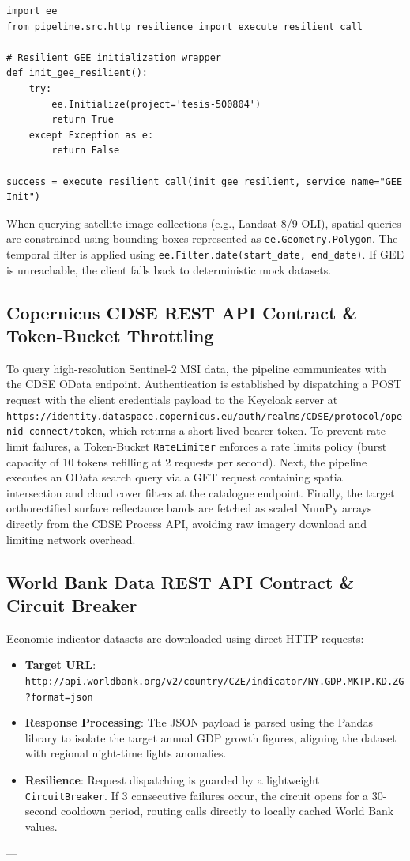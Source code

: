 \begin{verbatim}
import ee
from pipeline.src.http_resilience import execute_resilient_call

# Resilient GEE initialization wrapper
def init_gee_resilient():
    try:
        ee.Initialize(project='tesis-500804')
        return True
    except Exception as e:
        return False

success = execute_resilient_call(init_gee_resilient, service_name="GEE Init")
\end{verbatim}
When querying satellite image collections (e.g., Landsat-8/9 OLI), spatial queries are constrained using bounding boxes represented as \texttt{ee.Geometry.Polygon}. The temporal filter is applied using \texttt{ee.Filter.date(start\_date, end\_date)}. If GEE is unreachable, the client falls back to deterministic mock datasets.

\subsection{Copernicus CDSE REST API Contract \& Token-Bucket Throttling}
To query high-resolution Sentinel-2 MSI data, the pipeline communicates with the CDSE OData endpoint. Authentication is established by dispatching a POST request with the client credentials payload to the Keycloak server at \texttt{https://identity.dataspace.copernicus.eu/auth/realms/CDSE/protocol/openid-connect/token}, which returns a short-lived bearer token. To prevent rate-limit failures, a Token-Bucket \texttt{RateLimiter} enforces a rate limits policy (burst capacity of 10 tokens refilling at 2 requests per second). Next, the pipeline executes an OData search query via a GET request containing spatial intersection and cloud cover filters at the catalogue endpoint. Finally, the target orthorectified surface reflectance bands are fetched as scaled NumPy arrays directly from the CDSE Process API, avoiding raw imagery download and limiting network overhead.

\subsection{World Bank Data REST API Contract \& Circuit Breaker}
Economic indicator datasets are downloaded using direct HTTP requests:
\begin{itemize}
  \item \textbf{Target URL}: \texttt{http://api.worldbank.org/v2/country/CZE/indicator/NY.GDP.MKTP.KD.ZG?format=json}
  \item \textbf{Response Processing}: The JSON payload is parsed using the Pandas library to isolate the target annual GDP growth figures, aligning the dataset with regional night-time lights anomalies.
  \item \textbf{Resilience}: Request dispatching is guarded by a lightweight \texttt{CircuitBreaker}. If 3 consecutive failures occur, the circuit opens for a 30-second cooldown period, routing calls directly to locally cached World Bank values.

\end{itemize}
---

